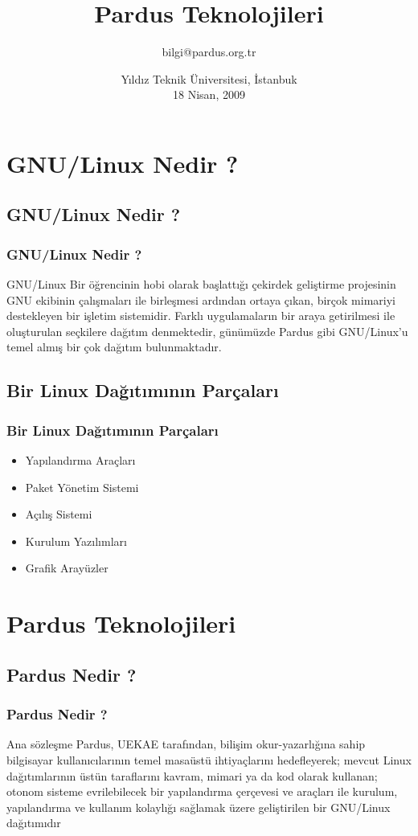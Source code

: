 \documentclass{beamer}
\title{Pardus Teknolojileri}
\author[Gökmen Göksel \& Gökçen Eraslan]{bilgi@pardus.org.tr}
\date{Yıldız Teknik Üniversitesi, İstanbuk\\ 18 Nisan, 2009}
\institute{
  Ulusal Elektronik ve Kriptoloji Araştırma Enstitüsü\\
  TÜBİTAK}
\begin{document}
\frame{\titlepage}

\section{GNU/Linux Nedir ?}

\subsection{GNU/Linux Nedir ?}
\frame
{
    \frametitle{GNU/Linux Nedir ?}
    \begin{block}{GNU/Linux}
        Bir öğrencinin hobi olarak başlattığı çekirdek geliştirme projesinin GNU ekibinin çalışmaları ile birleşmesi ardından ortaya çıkan, birçok mimariyi destekleyen bir işletim sistemidir. Farklı uygulamaların bir araya getirilmesi ile oluşturulan seçkilere dağıtım denmektedir, günümüzde Pardus gibi GNU/Linux'u temel almış bir çok dağıtım bulunmaktadır.
    \end{block}
}

\subsection{Bir Linux Dağıtımının Parçaları}
\frame
{
    \frametitle{Bir Linux Dağıtımının Parçaları}
    \begin{itemize}
       \item Yapılandırma Araçları
       \item Paket Yönetim Sistemi
       \item Açılış Sistemi
       \item Kurulum Yazılımları
       \item Grafik Arayüzler
    \end{itemize}
}

\section{Pardus Teknolojileri}

\subsection{Pardus Nedir ?}
\frame
{
    \frametitle{Pardus Nedir ?}
    \begin{block}{Ana sözleşme}
        Pardus, UEKAE tarafından, bilişim okur-yazarlığına sahip bilgisayar kullanıcılarının temel masaüstü ihtiyaçlarını hedefleyerek; mevcut Linux dağıtımlarının üstün taraflarını kavram, mimari ya da kod olarak kullanan; otonom sisteme evrilebilecek bir yapılandırma çerçevesi ve araçları ile kurulum, yapılandırma ve kullanım kolaylığı sağlamak üzere geliştirilen bir GNU/Linux dağıtımıdır
    \end{block}
}
\end{document}
